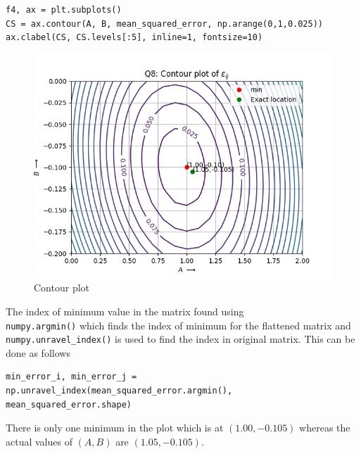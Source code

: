 \documentclass[12pt, a4paper]{report}
\begin{document}
\begin{lstlisting}
f4, ax = plt.subplots()
CS = ax.contour(A, B, mean_squared_error, np.arange(0,1,0.025))
ax.clabel(CS, CS.levels[:5], inline=1, fontsize=10)
\end{lstlisting}

 \begin{figure}[H]
 \centering
	\includegraphics[scale=0.8]{Figure_4.png}  %
	\caption{Contour plot}
	\label{fig4}
 \end{figure}
The index of minimum value in the matrix found using \\ \texttt{numpy.argmin()} which finds the index of minimum for the flattened matrix and \texttt{numpy.unravel\_index()} is used to find the index in original matrix. This can be done as follows
\begin{lstlisting}
min_error_i, min_error_j = np.unravel_index(mean_squared_error.argmin(), mean_squared_error.shape)
\end{lstlisting}
There is only one minimum in the plot which is at $(1.00,-0.105)$ whereas the actual values of $(A,B)$ are $(1.05,-0.105)$.
\end{document}
